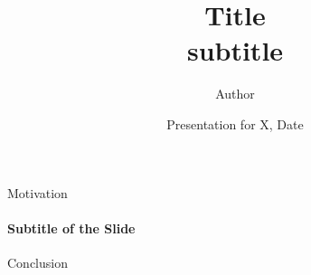 \documentclass[10pt,english,aspectratio=169]{beamer}
\title[]{Title\\ {\small subtitle}}
\author[] %
    {Author \inst{1}}
\institute[] %
    {
      \inst{1}%
      University
    }
\date[] %
    {\small Presentation for X, Date}
\begin{document}
\begin{frame}
    \maketitle
\end{frame}



\begin{frame}{Motivation}
    \framesubtitle{Subtitle of the Slide} %

\end{frame}


\begin{frame}{Conclusion}

\end{frame}



%     
\end{document}
